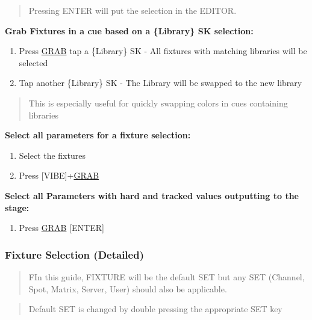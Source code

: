 \documentclass[
]{article}
\providecommand{\tightlist}{%
  \setlength{\itemsep}{0pt}\setlength{\parskip}{0pt}}
\begin{document}
\begin{quote}
Pressing ENTER will put the selection in the EDITOR.
\end{quote}

\textbf{Grab Fixtures in a cue based on a \{Library\} SK selection:}

\begin{enumerate}
\def\labelenumi{\arabic{enumi}.}
\item
  Press \protect\hyperlink{grab}{GRAB} tap a \{Library\} SK - All fixtures with matching libraries will be selected
\item
  Tap another \{Library\} SK - The Library will be swapped to the new library
\end{enumerate}

\begin{quote}
This is especially useful for quickly swapping colors in cues containing libraries
\end{quote}

\textbf{Select all parameters for a fixture selection:}

\begin{enumerate}
\def\labelenumi{\arabic{enumi}.}
\item
  Select the fixtures
\item
  Press {[}VIBE{]}+\protect\hyperlink{grab}{GRAB}
\end{enumerate}

\textbf{Select all Parameters with hard and tracked values outputting to the stage:}

\begin{enumerate}
\def\labelenumi{\arabic{enumi}.}
\tightlist
\item
  Press \protect\hyperlink{grab}{GRAB} {[}ENTER{]}
\end{enumerate}

\hypertarget{fixture-selection-detailed}{%
\subsubsection{Fixture Selection (Detailed)}\label{fixture-selection-detailed}}

\begin{quote}
FIn this guide, FIXTURE will be the default SET but any SET (Channel, Spot, Matrix, Server, User) should also be applicable.
\end{quote}

\begin{quote}
Default SET is changed by double pressing the appropriate SET key
\end{quote}
\end{document}
